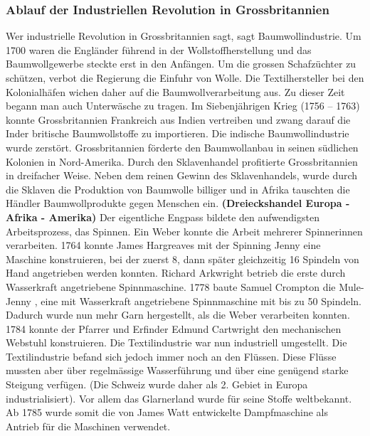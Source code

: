 \documentclass[10pt, openright=true]{scrartcl}
\begin{document}
\subsubsection{Ablauf der Industriellen Revolution in Grossbritannien}
Wer \glqq industrielle Revolution \grqq  in Grossbritannien sagt, sagt Baumwollindustrie. Um 1700 waren die Engländer führend in der Wollstoffherstellung und das Baumwollgewerbe steckte erst in den Anfängen. Um die grossen Schafzüchter zu schützen, verbot die Regierung die Einfuhr von Wolle. Die Textilhersteller bei den Kolonialhäfen wichen daher auf die Baumwollverarbeitung aus. Zu dieser Zeit begann man auch Unterwäsche zu tragen. Im Siebenjährigen Krieg (1756 – 1763) konnte Grossbritannien Frankreich aus Indien vertreiben und zwang darauf die Inder britische Baumwollstoffe zu importieren. Die indische Baumwollindustrie wurde zerstört. Grossbritannien förderte den Baumwollanbau in seinen südlichen Kolonien in Nord-Amerika. Durch den Sklavenhandel profitierte Grossbritannien in dreifacher Weise. Neben dem reinen Gewinn des Sklavenhandels, wurde durch die Sklaven die Produktion von Baumwolle billiger und in Afrika tauschten die Händler Baumwollprodukte gegen Menschen ein. \textbf{(Dreieckshandel Europa - Afrika - Amerika)} Der eigentliche Engpass bildete den aufwendigsten Arbeitsprozess, das Spinnen. Ein Weber konnte die Arbeit mehrerer Spinnerinnen verarbeiten. 1764 konnte James Hargreaves mit der \glqq  Spinning Jenny \grqq eine Maschine konstruieren, bei der zuerst 8, dann später gleichzeitig 16 Spindeln von Hand angetrieben werden konnten. Richard Arkwright betrieb die erste durch Wasserkraft angetriebene Spinnmaschine. 1778 baute Samuel Crompton die \glqq  Mule-Jenny \grqq, eine mit Wasserkraft angetriebene Spinnmaschine mit bis zu 50 Spindeln. Dadurch wurde nun mehr Garn hergestellt, als die Weber verarbeiten konnten. 1784 konnte der Pfarrer und Erfinder Edmund Cartwright den mechanischen Webstuhl konstruieren. Die Textilindustrie war nun industriell umgestellt. Die Textilindustrie befand sich jedoch immer noch an den Flüssen. Diese Flüsse mussten aber über regelmässige Wasserführung und über eine genügend starke Steigung verfügen. (Die Schweiz wurde daher als 2. Gebiet in Europa industrialisiert). Vor allem das Glarnerland wurde für seine Stoffe weltbekannt. Ab 1785 wurde somit die von James Watt entwickelte Dampfmaschine als Antrieb für die Maschinen verwendet.\\ \\
\end{document}

